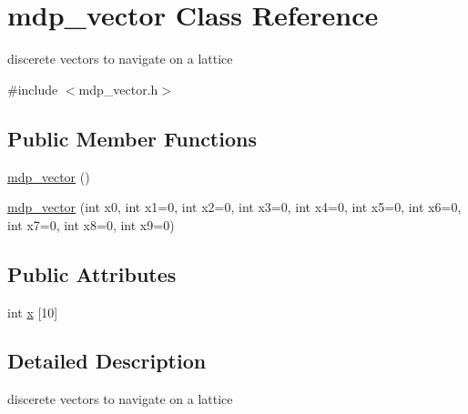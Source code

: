 \hypertarget{classmdp__vector}{
\section{mdp\_\-vector Class Reference}
\label{classmdp__vector}
}


discerete vectors to navigate on a lattice  


{\ttfamily \#include $<$mdp\_\-vector.h$>$}\subsection*{Public Member Functions}
\begin{DoxyCompactItemize}
\item 
\hyperlink{classmdp__vector_a5be7b2dcf1da5df366175d5d02116cf4}{mdp\_\-vector} ()
\item 
\hyperlink{classmdp__vector_a2329077b47bdadc32142aa6c2788ad6f}{mdp\_\-vector} (int x0, int x1=0, int x2=0, int x3=0, int x4=0, int x5=0, int x6=0, int x7=0, int x8=0, int x9=0)
\end{DoxyCompactItemize}
\subsection*{Public Attributes}
\begin{DoxyCompactItemize}
\item 
int \hyperlink{classmdp__vector_ae8332afc86ad8644e393657da2f109e4}{x} \mbox{[}10\mbox{]}
\end{DoxyCompactItemize}


\subsection{Detailed Description}
discerete vectors to navigate on a lattice 

